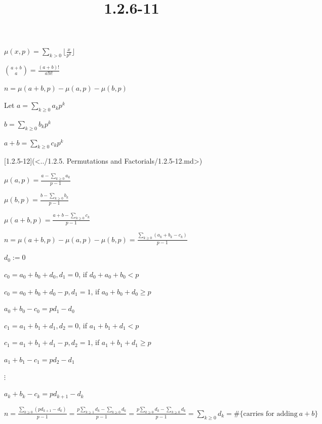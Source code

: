 \documentclass{article}
\title{1.2.6-11}
\begin{document}
\maketitle

\( \mu(x,p) = \sum_{k > 0}{\lfloor{\frac{x}{p^k}}\rfloor} \)

\( \binom{a+b}{a} = \frac{(a+b)!}{a!b!} \)

\( n = \mu(a+b,p) - \mu(a,p) - \mu(b, p) \)

Let \( a = \sum_{k \geq 0} a_k p^k \)

\( b = \sum_{k \geq 0} b_k p^k \)

\( a + b = \sum_{k \geq 0} c_k p^k \)

[1.2.5-12](<../1.2.5. Permutations and Factorials/1.2.5-12.md>)

\( \mu(a, p) = \frac{a - \sum_{k \geq 0} a_k}{p-1} \)

\( \mu(b, p) = \frac{b - \sum_{k \geq 0} b_k}{p-1} \)

\( \mu(a+b, p) = \frac{a+b - \sum_{k \geq 0} c_k}{p-1} \)

\( n = \mu(a+b,p) - \mu(a,p) - \mu(b, p) = \frac{\sum_{k \geq 0}(a_k + b_k - c_k)}{p-1} \)

\( d_0 := 0 \)

\( c_0 = a_0 + b_0 + d_0, d_1 = 0 \), if \( d_0 + a_0 + b_0 < p \)

\( c_0 = a_0 + b_0 + d_0 - p, d_1 = 1 \), if \( a_0 + b_0 + d_0 \geq p \)

\( a_0 + b_0 - c_0 = pd_1 - d_0 \)

\( c_1 = a_1 + b_1 + d_1, d_2 = 0 \), if \( a_1 + b_1 + d_1 < p \)

\( c_1 = a_1 + b_1 + d_1 - p, d_2 = 1 \), if \( a_1 + b_1 + d_1 \geq p \)

\( a_1 + b_1 - c_1 = pd_2 - d_1 \)

\( \vdots \)

\( a_k + b_k - c_k = pd_{k+1} - d_k \)

\( n = \frac{\sum_{k \geq 0}(pd_{k+1} - d_k)}{p-1} = \frac{p \sum_{k \geq 1}d_k - \sum_{k \geq 0}d_k}{p - 1} = \frac{p \sum_{k \geq 0}d_k - \sum_{k \geq 0}d_k}{p - 1} = \sum_{k \geq 0}d_k = \# \{ \textrm{carries for adding}\ a+b \} \)
\end{document}

